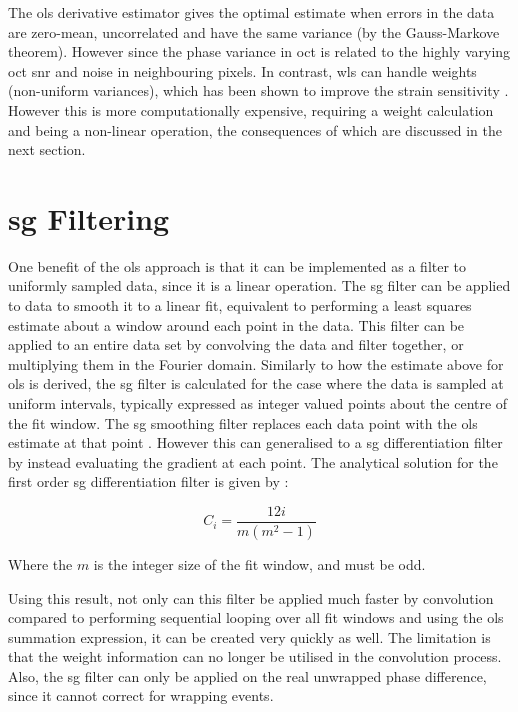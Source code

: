 The \ac{ols} derivative estimator gives the optimal estimate when errors in the data are zero-mean, uncorrelated and have the same variance (by the Gauss-Markove theorem). However since the phase variance in \ac{oct} is related to the highly varying \ac{oct} \ac{snr} and noise in neighbouring pixels. In contrast, \ac{wls} can handle weights (non-uniform variances), which has been shown to improve the strain sensitivity \cite{kennedy_strain_2012}. However this is more computationally expensive, requiring a weight calculation and being a non-linear operation, the consequences of which are discussed in the next section.

\section{\ac{sg} Filtering}\label{sg_filter}
One benefit of the \ac{ols} approach is that it can be implemented as a filter to uniformly sampled data, since it is a linear operation. The \ac{sg} filter \cite{savitzky_smoothing_1964} can be applied to data to smooth it to a linear fit, equivalent to performing a least squares estimate about a window around each point in the data. This filter can be applied to an entire data set by convolving the data and filter together, or multiplying them in the Fourier domain. 
Similarly to how the estimate above for \ac{ols} is derived, the \ac{sg} filter is calculated for the case where the data is sampled at uniform intervals, typically expressed as integer valued points about the centre of the fit window. The \ac{sg} smoothing filter replaces each data point with the \ac{ols} estimate at that point \cite{savitzky_smoothing_1964}. However this can generalised to a \ac{sg} differentiation filter by instead evaluating the gradient at each point. 
The analytical solution for the first order \ac{sg} differentiation filter is given by \cite{madden_comments_1978}:

\begin{equation}
	\label{sg_coeff}
	C_i = \frac{12 i}{m(m^2-1)}
\end{equation}

Where the $m$ is the integer size of the fit window, and must be odd.

Using this result, not only can this filter be applied much faster by convolution compared to performing sequential looping over all fit windows and using the \ac{ols} summation expression, it can be created very quickly as well. The limitation is that the weight information can no longer be utilised in the convolution process. Also, the \ac{sg} filter can only be applied on the real unwrapped phase difference, since it cannot correct for wrapping events. 

